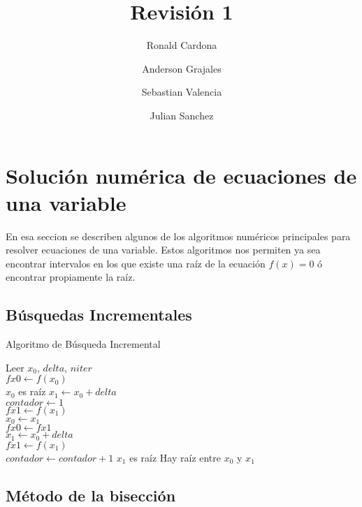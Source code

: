 \documentclass[12pt]{article}
\title{Revisión 1}
\author {Ronald Cardona
    \and Anderson Grajales
    \and Sebastian Valencia
    \and Julian Sanchez}
\begin{document}
 
    \maketitle 
    
    \section{Solución numérica de ecuaciones de una variable}
    
    En esa seccion se describen algunos de los algoritmos numéricos principales para resolver ecuaciones de una variable. Estos algoritmos nos permiten ya sea encontrar intervalos en los que existe una raíz de la ecuación $f(x) = 0$ ó encontrar propiamente la raíz.
    
    \subsection{Búsquedas Incrementales}
    
    \begin{algorithm}[H]
        \caption{Algoritmo de Búsqueda Incremental}
        \SetAlgoLined
        Leer $x_0$, $delta$, $niter$ \\
        $fx0 \leftarrow f(x_0)$ \\
        {$x_0$ es raíz}
        {
            $x_1 \leftarrow x_0 + delta$ \\
            $contador \leftarrow 1$ \\
            $fx1 \leftarrow f(x_1)$ \\
            {
                $x_0 \leftarrow x_1$ \\
                $fx0 \leftarrow fx1$ \\
                $x_1 \leftarrow x_0 + delta$ \\
                $fx1 \leftarrow f(x_1)$ \\
                $contador \leftarrow contador + 1$
            }
            {$x_1$ es raíz}
            {Hay raíz entre $x_0$ y $x_1$}
        }
    \end{algorithm}
    
    \subsection{Método de la bisección}
    
\end{document}

